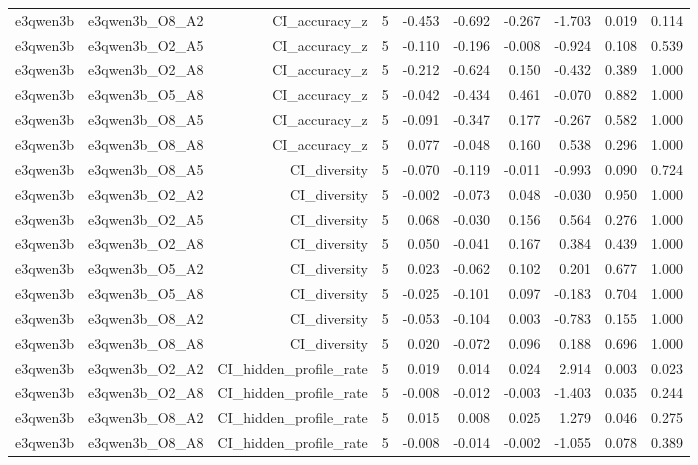 \documentclass[11pt]{article}
\begin{document}
\begin{landscape}
\begin{longtable}{@{}lrrrrrrrrr@{}}
e3qwen3b & e3qwen3b\_O8\_A2 & CI\_accuracy\_z & 5 & -0.453 & -0.692 & -0.267 & -1.703 & 0.019 & 0.114 \\
e3qwen3b & e3qwen3b\_O2\_A5 & CI\_accuracy\_z & 5 & -0.110 & -0.196 & -0.008 & -0.924 & 0.108 & 0.539 \\
e3qwen3b & e3qwen3b\_O2\_A8 & CI\_accuracy\_z & 5 & -0.212 & -0.624 & 0.150 & -0.432 & 0.389 & 1.000 \\
e3qwen3b & e3qwen3b\_O5\_A8 & CI\_accuracy\_z & 5 & -0.042 & -0.434 & 0.461 & -0.070 & 0.882 & 1.000 \\
e3qwen3b & e3qwen3b\_O8\_A5 & CI\_accuracy\_z & 5 & -0.091 & -0.347 & 0.177 & -0.267 & 0.582 & 1.000 \\
e3qwen3b & e3qwen3b\_O8\_A8 & CI\_accuracy\_z & 5 & 0.077 & -0.048 & 0.160 & 0.538 & 0.296 & 1.000 \\
e3qwen3b & e3qwen3b\_O8\_A5 & CI\_diversity & 5 & -0.070 & -0.119 & -0.011 & -0.993 & 0.090 & 0.724 \\
e3qwen3b & e3qwen3b\_O2\_A2 & CI\_diversity & 5 & -0.002 & -0.073 & 0.048 & -0.030 & 0.950 & 1.000 \\
e3qwen3b & e3qwen3b\_O2\_A5 & CI\_diversity & 5 & 0.068 & -0.030 & 0.156 & 0.564 & 0.276 & 1.000 \\
e3qwen3b & e3qwen3b\_O2\_A8 & CI\_diversity & 5 & 0.050 & -0.041 & 0.167 & 0.384 & 0.439 & 1.000 \\
e3qwen3b & e3qwen3b\_O5\_A2 & CI\_diversity & 5 & 0.023 & -0.062 & 0.102 & 0.201 & 0.677 & 1.000 \\
e3qwen3b & e3qwen3b\_O5\_A8 & CI\_diversity & 5 & -0.025 & -0.101 & 0.097 & -0.183 & 0.704 & 1.000 \\
e3qwen3b & e3qwen3b\_O8\_A2 & CI\_diversity & 5 & -0.053 & -0.104 & 0.003 & -0.783 & 0.155 & 1.000 \\
e3qwen3b & e3qwen3b\_O8\_A8 & CI\_diversity & 5 & 0.020 & -0.072 & 0.096 & 0.188 & 0.696 & 1.000 \\
e3qwen3b & e3qwen3b\_O2\_A2 & CI\_hidden\_profile\_rate & 5 & 0.019 & 0.014 & 0.024 & 2.914 & 0.003 & 0.023 \\
e3qwen3b & e3qwen3b\_O2\_A8 & CI\_hidden\_profile\_rate & 5 & -0.008 & -0.012 & -0.003 & -1.403 & 0.035 & 0.244 \\
e3qwen3b & e3qwen3b\_O8\_A2 & CI\_hidden\_profile\_rate & 5 & 0.015 & 0.008 & 0.025 & 1.279 & 0.046 & 0.275 \\
e3qwen3b & e3qwen3b\_O8\_A8 & CI\_hidden\_profile\_rate & 5 & -0.008 & -0.014 & -0.002 & -1.055 & 0.078 & 0.389 \\

\end{longtable}
\end{landscape}
\end{document}
